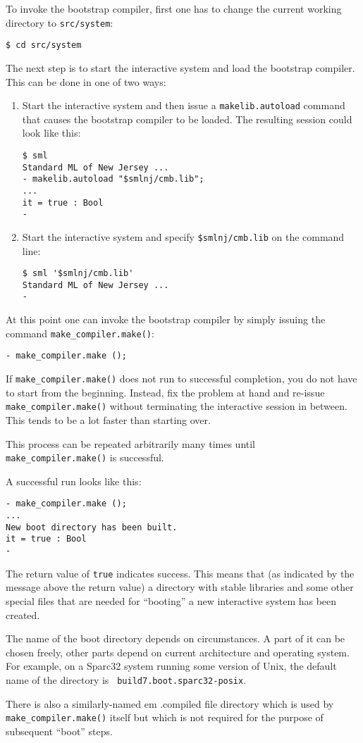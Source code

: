To invoke the bootstrap compiler, first one has to change the current
working directory to {\tt src/system}:

\begin{verbatim}
$ cd src/system
\end{verbatim}

The next step is to start the interactive system and load the
bootstrap compiler.  This can be done in one of two ways:

\begin{enumerate}
\item Start the interactive system and then issue a {\tt makelib.autoload}
command that causes the bootstrap compiler to be loaded. The resulting
session could look like this:
\begin{verbatim}
$ sml
Standard ML of New Jersey ...
- makelib.autoload "$smlnj/cmb.lib";
...
it = true : Bool
-
\end{verbatim}
\item Start the interactive system and specify {\tt \$smlnj/cmb.lib} on
the command line:
\begin{verbatim}
$ sml '$smlnj/cmb.lib'
Standard ML of New Jersey ...
-  
\end{verbatim}
\end{enumerate}

At this point one can invoke the bootstrap compiler by simply issuing
the command {\tt make_compiler.make()}:

\begin{verbatim}
- make_compiler.make ();
\end{verbatim}

If {\tt make_compiler.make()} does not run to successful completion, you do not
have to start from the beginning.  Instead, fix the problem at hand
and re-issue {\tt make_compiler.make()} without terminating the interactive
session in between.  This tends to be a lot faster than starting over.

This process can be repeated arbitrarily many times until {\tt
make_compiler.make()} is successful.

A successful run looks like this:

\begin{verbatim}
- make_compiler.make ();
...
New boot directory has been built.
it = true : Bool
- 
\end{verbatim}

The return value of {\tt true} indicates success.  This means that (as
indicated by the message above the return value) a directory with
stable libraries and some other special files that are needed for
``booting'' a new interactive system has been created.

The name of the boot directory depends on circumstances.  A part of it
can be chosen freely, other parts depend on current architecture and
operating system.  For example, on a Sparc32 system running some version
of Unix, the default name of the directory is {\tt
build7.boot.sparc32-posix}.

There is also a similarly-named {em .compiled file directory} which is used
by {\tt make_compiler.make()} itself but which is not required for the purpose
of subsequent ``boot'' steps.

